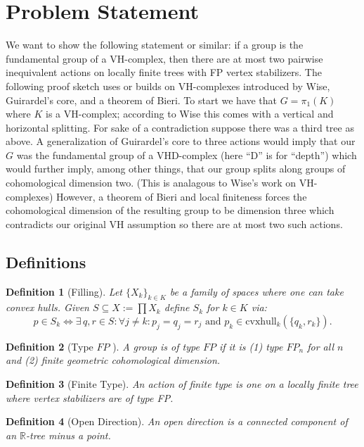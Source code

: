 \documentclass{article}
\theoremstyle{mystyle}
\newtheorem{defn}{Definition}
\theoremstyle{remark}
\begin{document}
\section{Problem Statement}
We want to show the following statement or similar: if a group is the fundamental group of a VH-complex, then there are at most two pairwise inequivalent actions on locally finite trees with FP vertex stabilizers. The following proof sketch uses or builds on VH-complexes introduced by Wise, Guirardel's core, and a theorem of Bieri. To start we have that \(G = \pi_1(K)\) where \(K\) is a VH-complex; according to Wise this comes with a vertical and horizontal splitting. For sake of a contradiction suppose there was a third tree as above. A generalization of Guirardel's core to three actions would imply that our \(G\) was the fundamental group of a VHD-complex (here ``D'' is for ``depth'') which would further imply, among other things, that our group splits along groups of cohomological dimension two. (This is analagous to Wise's work on VH-complexes) However, a theorem of Bieri and local finiteness forces the cohomological dimension of the resulting group to be dimension three which contradicts our original VH assumption so there are at most two such actions.

\subsection{Definitions}

\begin{defn}
	[Filling]
    Let \(\{X_{k}\}_{k \in K}\) be a family of spaces where one can take convex hulls. Given \(S \subseteq X := \prod X_{k}\) define \(S_{k}\) for \(k \in K\) via: \[p \in S_{k} \iff \exists \,q,r \in S: \forall j \neq k: p_{j} = q_{j} = r_{j} \text{ and } p_{k} \in \text{cvxhull}_k (\{q_{k} , r_{k}\}).\] 
\end{defn}
\begin{defn}
	[Type \(FP\) ]
	A group is of type \(FP\) if it is (1) type \(FP_n\) for all \(n\) and (2) finite geometric cohomological dimension.
\end{defn}

\begin{defn}
	[Finite Type] 
	An action of {\em finite type} is one on a locally finite tree where  vertex stabilizers are of type FP.
\end{defn}

\begin{defn}[Open Direction] An open direction is a connected component of an \(\mathbb{R}\)-tree minus a point. 
\end{defn}
\end{document}
